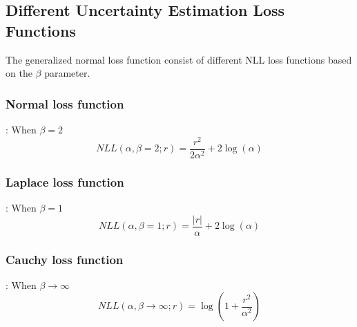 \documentclass[letterpaper, 10 pt, conference]{ieeeconf}  %
\begin{document}



\subsection{Different Uncertainty Estimation Loss Functions}
The generalized normal loss function consist of different NLL loss functions based on the $\beta$ parameter.
\subsubsection{Normal loss function}: When $\beta = 2$
\begin{equation*}
    NLL(\alpha, \beta=2; r) = \frac{r^2}{2\alpha^2} + 2\log{(\alpha)}
\end{equation*}
\subsubsection{Laplace loss function}: When $\beta = 1$
\begin{equation*}
     NLL(\alpha, \beta=1; r)  = \frac{|r|}{\alpha} + 2\log{(\alpha)}
\end{equation*}

\subsubsection{Cauchy loss function}: When $ {\beta \to \infty} $
\begin{equation*}
   NLL(\alpha, \beta \to \infty ; r) = \log \left( 1 + \frac{r^2}{\alpha^2} \right)
\end{equation*}
\end{document}
